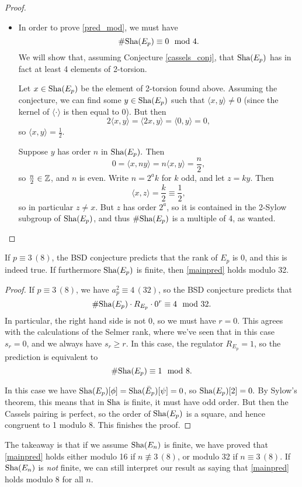 \documentclass[12pt, a4paper]{report}
\begin{document}
\begin{proof}
\begin{itemize}
  \item In order to prove \autoref{pred_mod}, we must have
    \[\# \text{\normalfont Sha}(E_p) \equiv 0 \mod{4}.\]
    We will show that, assuming Conjecture \autoref{cassels_conj}, 
    that $\text{\normalfont Sha}(E_p)$ has in fact at least 4 elements of 2-torsion. 

    Let $x \in \text{\normalfont Sha}(E_p)$ be the element of 2-torsion found above. Assuming the
    conjecture, we can find some $y \in \text{\normalfont Sha}(E_p)$ such that $\langle x,y \rangle \neq 0$
    (since the kernel of $\langle \cdot \rangle$ is then equal to 0). But then
    \[2 \langle x,y \rangle = \langle 2x,y \rangle = \langle 0, y \rangle = 0,\]
    so $\langle x,y \rangle = \frac{1}{2}.$
    
    Suppose $y$ has order $n$ in $\text{\normalfont Sha}(E_p).$ Then
    \[0 = \langle x,ny \rangle = n \langle x,y \rangle = \frac{n}{2},\]
    so $\frac{n}{2} \in {\mathbb Z}$, and $n$ is even. Write $n = 2^a k$ for $k$ odd,
    and let $z = ky$. Then
    \[\langle x,z \rangle = \frac{k}{2} \equiv \frac{1}{2},\]
    so in particular $z \neq x$. But $z$ has order $2^a$, so it is contained in
    the 2-Sylow subgroup of $\text{\normalfont Sha}(E_p)$, and thus $\# \text{\normalfont Sha}(E_p)$ is a multiple
    of 4, as wanted.

  \end{itemize}
\end{proof}

\begin{thm} \label{mainthm1}
  If $p \equiv 3 \, (8)$, the BSD conjecture predicts
  that the rank of $E_p$ is 0, and this is indeed true. If furthermore $\text{\normalfont Sha}(E_p)$ is
  finite, then \autoref{mainpred} holds modulo 32.
\end{thm}

\begin{proof}
  If $p \equiv 3 \, (8)$, we have $a_p^2 \equiv 4 \, (32)$, 
  so the BSD conjecture predicts that
  \[\# \text{\normalfont Sha}(E_p) \cdot R_{E_p} \cdot 0^r \equiv 4 \mod{32}.\]
  In particular, the right hand side is not 0, so we must have $r = 0$. This
  agrees with the calculations of the Selmer rank, where we've seen that in this
  case $s_r = 0$, and we always have $s_r \geq r.$ In this case, the regulator
  $R_{E_p} = 1$, so the prediction is equivalent to
  \[\# \text{\normalfont Sha}(E_p) \equiv 1 \mod{8}.\] 

  In this case we have $\text{\normalfont Sha}(E_p)[\phi] = \text{\normalfont Sha}(\bar{E}_p)[\psi] = 0$, so
  $\text{\normalfont Sha}(E_p)[2] = 0.$ By Sylow's theorem, this means that in $\text{\normalfont Sha}$ is finite,
  it must have odd order. But then the Cassels pairing is perfect, so the order
  of $\text{\normalfont Sha}(E_p)$ is a square, and hence congruent to 1 modulo 8. This finishes
  the proof.
\end{proof}

The takeaway is that if we assume $\text{\normalfont Sha}(E_n)$ is finite, we have proved that
\autoref{mainpred} holds either modulo 16 if $n \not\equiv 3 \, (8)$, or modulo 32
if $n \equiv 3 \, (8)$. If $\text{\normalfont Sha}(E_n)$ is \textit{not} finite, we can still
interpret our result as saying that \autoref{mainpred} holds modulo 8 for all $n$.

\nocite{*}
\printbibliography[heading=bibintoc]
\end{document}
